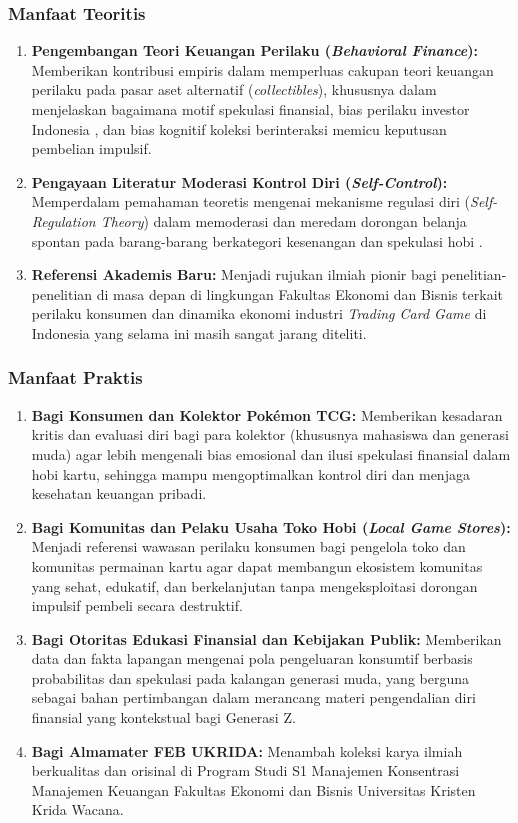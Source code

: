 \documentclass[12pt,a4paper]{article}
\numberwithin{equation}{section}
\numberwithin{table}{section}
\numberwithin{figure}{section}
\begin{document}
\subsubsection{Manfaat Teoritis}
\begin{enumerate}
  \item \textbf{Pengembangan Teori Keuangan Perilaku (\emph{Behavioral Finance}):} Memberikan kontribusi empiris dalam memperluas cakupan teori keuangan perilaku pada pasar aset alternatif (\emph{collectibles}), khususnya dalam menjelaskan bagaimana motif spekulasi finansial, bias perilaku investor Indonesia \citep{colline2024biases}, dan bias kognitif koleksi berinteraksi memicu keputusan pembelian impulsif.
  \item \textbf{Pengayaan Literatur Moderasi Kontrol Diri (\emph{Self-Control}):} Memperdalam pemahaman teoretis mengenai mekanisme regulasi diri (\emph{Self-Regulation Theory}) dalam memoderasi dan meredam dorongan belanja spontan pada barang-barang berkategori kesenangan dan spekulasi hobi \citep{sultan2012building, apidana2022peran, lienardy2026role}.
  \item \textbf{Referensi Akademis Baru:} Menjadi rujukan ilmiah pionir bagi penelitian-penelitian di masa depan di lingkungan Fakultas Ekonomi dan Bisnis terkait perilaku konsumen dan dinamika ekonomi industri \emph{Trading Card Game} di Indonesia yang selama ini masih sangat jarang diteliti.
\end{enumerate}

\subsubsection{Manfaat Praktis}
\begin{enumerate}
  \item \textbf{Bagi Konsumen dan Kolektor Pok\'emon TCG:} Memberikan kesadaran kritis dan evaluasi diri bagi para kolektor (khususnya mahasiswa dan generasi muda) agar lebih mengenali bias emosional dan ilusi spekulasi finansial dalam hobi kartu, sehingga mampu mengoptimalkan kontrol diri dan menjaga kesehatan keuangan pribadi.
  \item \textbf{Bagi Komunitas dan Pelaku Usaha Toko Hobi (\emph{Local Game Stores}):} Menjadi referensi wawasan perilaku konsumen bagi pengelola toko dan komunitas permainan kartu agar dapat membangun ekosistem komunitas yang sehat, edukatif, dan berkelanjutan tanpa mengeksploitasi dorongan impulsif pembeli secara destruktif.
  \item \textbf{Bagi Otoritas Edukasi Finansial dan Kebijakan Publik:} Memberikan data dan fakta lapangan mengenai pola pengeluaran konsumtif berbasis probabilitas dan spekulasi pada kalangan generasi muda, yang berguna sebagai bahan pertimbangan dalam merancang materi pengendalian diri finansial yang kontekstual bagi Generasi Z.
  \item \textbf{Bagi Almamater FEB UKRIDA:} Menambah koleksi karya ilmiah berkualitas dan orisinal di Program Studi S1 Manajemen Konsentrasi Manajemen Keuangan Fakultas Ekonomi dan Bisnis Universitas Kristen Krida Wacana.
\end{enumerate}
\end{document}
